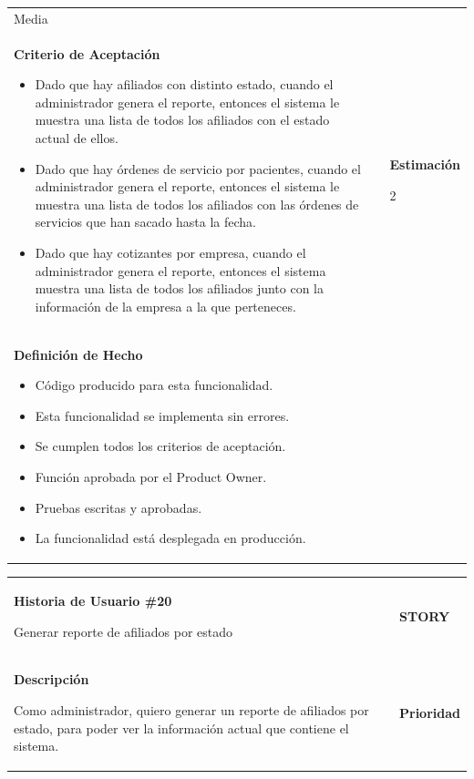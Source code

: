 \documentclass[12pt,a4paper]{article}
\begin{document}
\begin{center}
\begin{tabular}{|>{\columncolor[RGB]{215, 215, 215}} p{10cm} >{\columncolor[RGB]{215, 215, 215}} c >{\columncolor[RGB]{215, 215, 215}} p{2.5cm}|}
Media\\

\textbf{Criterio de Aceptación}

\begin{itemize}
\item Dado que hay afiliados con distinto estado, cuando el
administrador genera el reporte, entonces el sistema le muestra
una lista de todos los afiliados con el estado actual de ellos.
\item Dado que hay órdenes de servicio por pacientes, cuando el
administrador genera el reporte, entonces el sistema le muestra
una lista de todos los afiliados con las órdenes de servicios que
han sacado hasta la fecha.
\item Dado que hay cotizantes por empresa, cuando el administrador
genera el reporte, entonces el sistema muestra una lista de todos
los afiliados junto con la información de la empresa a la que
perteneces.
\end{itemize} & & \textbf{Estimación}

2 \\ 

\textbf{Definición de Hecho}

\begin{itemize}
\item Código producido para esta funcionalidad.
\item Esta funcionalidad se implementa sin errores.
\item Se cumplen todos los criterios de aceptación.
\item Función aprobada por el Product Owner.
\item Pruebas escritas y aprobadas.
\item La funcionalidad está desplegada en producción.
\end{itemize} & & \\
\hline 
\end{tabular}
\vspace{5mm}

\begin{tabular}{| p{10cm} c p{2.5cm}|}
\hline 
\textbf{Historia de Usuario \#20}

Generar reporte de afiliados por estado & & \textbf{{\Large STORY}} \\ 
\textbf{Descripción}

Como administrador, quiero generar un reporte de afiliados por estado,
para poder ver la información actual que contiene el sistema. &  & \textbf{Prioridad}


\end{tabular}
\end{center}
\end{document}

